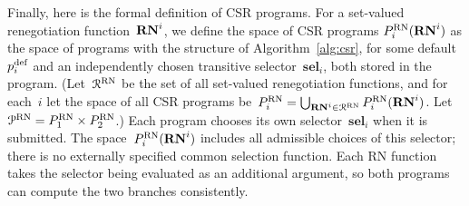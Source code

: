 \documentclass[sigconf]{aamas}
\newcommand{\allprogreneg}{\allprog^{\text{RN}}}
\newcommand{\selection}{sel}%
\newcommand{\renegb}{\mathbf{\selection}}
\theoremstyle{definition}
\begin{document}





Finally, here 
is the formal definition of CSR
programs. For a
set-valued
renegotiation
function~$\mathbf{RN}^{i}$,
we define
the space of
CSR
programs
$P_i^{\textnormal{RN}}(\mathbf{RN}^{i})$
as the
space of programs
with the structure
of
Algorithm~\ref{alg:csr},
for some default~$p_i^{\textnormal{def}}$ and an independently chosen transitive
selector~$\renegb_i$, both stored in the program.
(Let~$\mathcal{R}^{\textnormal{RN}}$ be the set of all
set-valued renegotiation 
functions,
and for each~$i$
let the space of all
CSR
programs be~$P_i^{\textnormal{RN}} = \bigcup_{\mathbf{RN}^{i} \in \mathcal{R}^{\textnormal{RN}}} P_i^{\textnormal{RN}}(\mathbf{RN}^{i})$.
 Let $\allprogreneg = \fullfsspaceone \times \fullfsspacetwo$.)
Each program chooses its own selector~$\renegb_i$ when it is submitted.
The space~$P_i^{\textnormal{RN}}(\mathbf{RN}^{i})$ includes all admissible choices of this selector;
there is no externally specified common selection function.
Each RN function takes the selector being evaluated as an additional
argument, so both programs can compute the two branches consistently.
\end{document}
